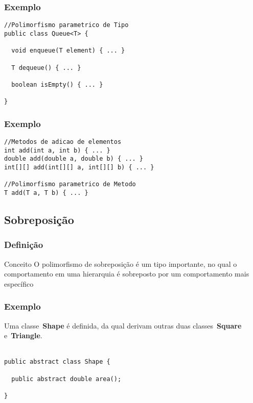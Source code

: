 \begin{frame}[fragile]
\frametitle{Exemplo}
\justifying
\begin{lstlisting}
//Polimorfismo parametrico de Tipo
public class Queue<T> {
	
  void enqueue(T element) { ... }

  T dequeue() { ... }

  boolean isEmpty() { ... }

}
\end{lstlisting}
\end{frame}

\begin{frame}[fragile]
\frametitle{Exemplo}
\justifying
\begin{lstlisting}
//Metodos de adicao de elementos
int add(int a, int b) { ... }
double add(double a, double b) { ... }
int[][] add(int[][] a, int[][] b) { ... }

//Polimorfismo parametrico de Metodo
T add(T a, T b) { ... }
\end{lstlisting}
\end{frame}

\subsection{Sobreposição}

\begin{frame}
\frametitle{Definição}
\justifying
\begin{block}{Conceito}
\qquad O polimorfismo de sobreposição é um tipo importante, no qual o comportamento em uma hierarquia é sobreposto por um comportamento mais específico
\end{block}
\end{frame}

\begin{frame}[fragile]
\frametitle{Exemplo}
\justifying
\quad Uma classe~\textbf{Shape} é definida, da qual derivam outras duas classes~\textbf{Square} e~\textbf{Triangle}.
\\~\\
\begin{lstlisting}
public abstract class Shape {
	
  public abstract double area();

}
\end{lstlisting}
\end{frame}

